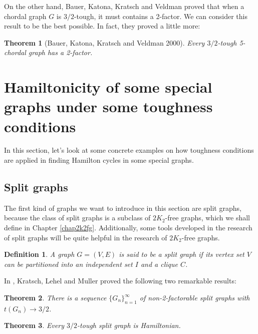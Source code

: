 \documentclass[12pt]{report}
\newtheorem{theorem}{Theorem}
\newtheorem{definition}{Definition}
\begin{document}
On the other hand, Bauer, Katona, Kratsch and Veldman \cite{bauer2000chordality} proved that when a chordal graph $G$ is $3/2$-tough, it must contains a 2-factor. We can consider this result to be the best possible. In fact, they proved a little more:
\begin{theorem}[Bauer, Katona, Kratsch and Veldman 2000]\label{32tchgc2fth}
Every $3/2$-tough 5-chordal graph has a 2-factor.
\end{theorem}











\section{Hamiltonicity of some special graphs under some toughness conditions}
In this section, let's look at some concrete examples on how toughness conditions are applied in finding Hamilton cycles in some special graphs.
\subsection{Split graphs}\label{sec241spg}


The first kind of graphs we want to introduce in this section are split graphs, because the class of split graphs is a subclass of $2K_2$-free graphs, which we shall define in Chapter \ref{chap2k2fg}. Additionally, some tools developed in the research of split graphs will be quite helpful in the research of $2K_2$-free graphs.

\begin{definition}
A graph $G=(V,E)$ is said to be a split graph if its vertex set $V$ can be partitioned into an independent set $I$ and a clique $C$.
\end{definition}

In \cite{kratsch1996toughness}, Kratsch, Lehel and Muller proved the following two remarkable results:
\begin{theorem}\label{spn}{\cite[Theorem 3.1.]{kratsch1996toughness}}
There is a sequence $\{G_n\}^{\infty}_{n=1}$ of non-2-factorable split graphs with $t(G_n)\to3/2$.

\end{theorem}



\begin{theorem}\label{split}{\cite[Theorem 3.3.]{kratsch1996toughness}}
Every $3/2$-tough split graph is Hamiltonian.
\end{theorem}
\end{document}

